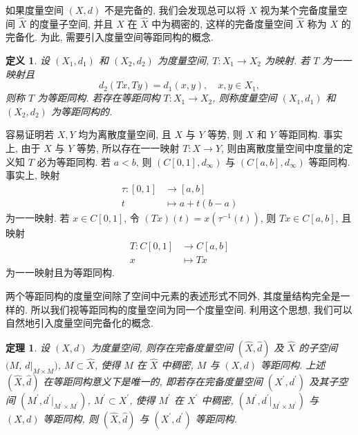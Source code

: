 \documentclass[openany]{ctexbook}
\theoremstyle{kaiti}
\newtheorem{definition}{定义}[section]
\newtheorem{theorem}{定理}[section]
\theoremstyle{normal}
\begin{document}
如果度量空间 $(X, d)$ 不是完备的, 我们会发现总可以将 $X$ 视为某个完备度量空间 $\hat{X}$ 的度量子空间, 并且 $X$ 在 $\hat{X}$ 中为稠密的, 这样的完备度量空间 $\hat{X}$ 称为 $X$ 的完备化. 为此, 需要引入度量空间等距同构的概念.

\begin{definition}
  设 $\left(X_1, d_1\right)$ 和 $\left(X_2, d_2\right)$ 为度量空间, $T: X_1 \rightarrow X_2$ 为映射. 若 $T$ 为一一映射且
  $$
  d_2(T x, T y)=d_1(x, y), \quad x, y \in X_1,
  $$
  则称 $T$ 为等距同构. 若存在等距同构 $T: X_1 \rightarrow X_2$, 则称度量空间 $\left(X_1, d_1\right)$ 和 $\left(X_2, d_2\right)$ 为等距同构的.
\end{definition}

容易证明若 $X, Y$ 均为离散度量空间, 且 $X$ 与 $Y$ 等势, 则 $X$ 和 $Y$ 等距同构. 事实上, 由于 $X$ 与 $Y$ 等势, 所以存在一一映射 $T: X \rightarrow Y$, 则由离散度量空间中度量的定义知 $T$ 必为等距同构. 若 $a<b$, 则 $\left(C[0,1], d_{\infty}\right)$ 与 $\left(C[a, b], d_{\infty}\right)$ 等距同构. 事实上, 映射
$$
\begin{aligned}
  \tau:[0,1] &\rightarrow[a, b] \\
  t &\mapsto a+t(b-a)
\end{aligned}
$$
为一一映射. 若 $x \in C[0,1]$, 令 $(T x)(t)=x\left(\tau^{-1}(t)\right)$, 则 $T x \in C[a, b]$, 且映射
\begin{equation}
  \begin{aligned}
    T: C[0,1] & \rightarrow C[a, b] \\
    x & \mapsto T x
  \end{aligned}
\end{equation}
为一一映射且为等距同构.

两个等距同构的度量空间除了空间中元素的表述形式不同外, 其度量结构完全是一样的. 所以我们视等距同构的度量空间为同一个度量空间. 利用这个思想, 我们可以自然地引入度量空间完备化的概念.

\begin{theorem}
  设 $(X, d)$ 为度量空间, 则存在完备度量空间 $(\hat{X}, \hat{d})$ 及 $\hat{X}$ 的子空间 $(M$, $\hat{d}|_{M \times M})$, $M \subset \hat{X}$, 使得 $M$ 在 $\hat{X}$ 中稠密, $M$ 与 $(X, d)$ 等距同构. 上述 $(\hat{X}, \hat{d})$ 在等距同构意义下是唯一的, 即若存在完备度量空间 $(X^{\prime}, d^{\prime})$ 及其子空间 $(M^{\prime},d^{\prime}|_{M^{\prime} \times M^{\prime}})$, $M^{\prime} \subset X^{\prime}$, 使得 $M^{\prime}$ 在 $X^{\prime}$ 中稠密, $(M^{\prime},d^{\prime}|_{M^{\prime} \times M^{\prime}})$ 与 $(X, d)$ 等距同构, 则 $(\hat{X}, \hat{d})$ 与 $(X^{\prime}, d^{\prime})$ 等距同构.
\end{theorem}
\end{document}
